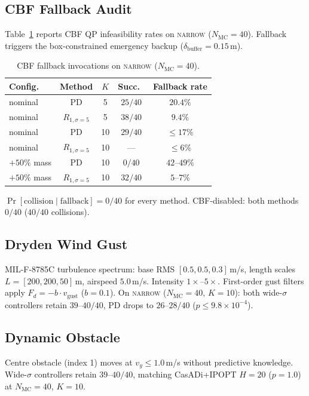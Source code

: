 \documentclass[11pt,a4paper]{article}
\newcommand{\Nm}{N_{\mathrm{MC}}}
\begin{document}
\subsection{CBF Fallback Audit}
Table~\ref{tab:s5-fallback} reports CBF QP infeasibility rates on
\textsc{narrow} ($\Nm = 40$). Fallback triggers the box-constrained
emergency backup ($\delta_{\mathrm{buffer}} = 0.15$\,m).
\begin{table}[h]
\centering
\caption{CBF fallback invocations on \textsc{narrow} ($\Nm = 40$).}\label{tab:s5-fallback}
\begin{tabular}{lcccc}
\toprule
Config.\ & Method & $K$ & Succ.\ & Fallback rate \\
\midrule
nominal & PD & 5 & $25/40$ & $20.4\%$ \\
nominal & $R_{1,\sigma=5}$ & 5 & $38/40$ & $9.4\%$ \\
nominal & PD & 10 & $29/40$ & $\le 17\%$ \\
nominal & $R_{1,\sigma=5}$ & 10 & --- & $\le 6\%$ \\
$+50\%$ mass & PD & 10 & $0/40$ & $42$--$49\%$ \\
$+50\%$ mass & $R_{1,\sigma=5}$ & 10 & $32/40$ & $5$--$7\%$ \\
\bottomrule
\end{tabular}
\par\smallskip
$\Pr[\text{collision}\mid\text{fallback}] = 0/40$ for every method.
CBF-disabled: both methods $0/40$ ($40/40$ collisions).
\end{table}

\subsection{Dryden Wind Gust}
MIL-F-8785C turbulence spectrum: base RMS $[0.5, 0.5, 0.3]$\,m/s,
length scales $L = [200, 200, 50]$\,m, airspeed $5.0$\,m/s. Intensity
$1\times$--$5\times$. First-order gust filters apply
$F_d = -b \cdot v_{\mathrm{gust}}$ ($b = 0.1$). On \textsc{narrow}
($\Nm = 40$, $K = 10$): both wide-$\sigma$ controllers retain
$39$--$40/40$, PD drops to $26$--$28/40$
($p \le 9.8 \times 10^{-4}$).

\subsection{Dynamic Obstacle}
Centre obstacle (index 1) moves at $v_y \le 1.0$\,m/s without
predictive knowledge. Wide-$\sigma$ controllers retain
$39$--$40/40$, matching CasADi+IPOPT $H = 20$ ($p = 1.0$)
at $\Nm = 40$, $K = 10$.
\end{document}
